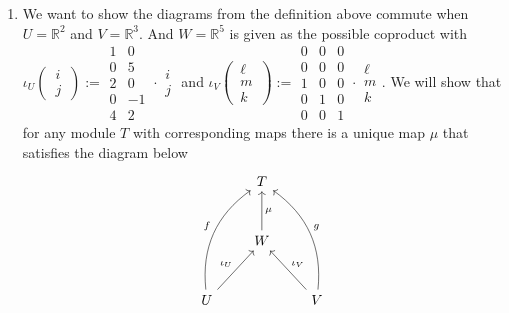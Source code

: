 \documentclass[12pt]{amsart}
\theoremstyle{definition}
\newcommand{\R}{\mathbb{R}}
\newcommand{\ip}[1]{\langle#1\rangle}
\begin{document}
\begin{enumerate}
\item %
 We want to show the diagrams from the definition above commute when $U=\R^2$ and $V=\R^3$. And $W=\R^5$ is given as the possible coproduct with $\iota_U\left(\,\boxed{\begin{matrix}i\\j \end{matrix}}\,\right):=
 \boxed{\begin{matrix}1 & 0 \\0 & 5 \\2 & 0 \\0 & -1 \\4 & 2\end{matrix}}\cdot\boxed{\begin{matrix}i\\j \end{matrix}}
$ and $\iota_V\left(\,\boxed{\begin{matrix}\ell\\m\\k \end{matrix}}\,\right):=
 \boxed{\begin{matrix}
0 & 0 & 0\\
0 & 0 & 0 \\
1 & 0 & 0 \\
0 & 1 & 0 \\
0 & 0 & 1
\end{matrix}}
\cdot \boxed{\begin{matrix}\ell\\m\\k \end{matrix}}$. We will show that for any module $T$ with corresponding maps there is a unique map $\mu$ that satisfies the diagram below
 \[
\begin{tikzcd}[row sep=1cm, column sep=.75cm]
     & T \\
     & W\arrow[u, "\mu"'] \\
     U\arrow[ur, "\iota_U"]\arrow[uur, bend left, "f"]& & V\arrow[uul, bend right, "g"']\arrow[ul, "\iota_V"']
    \end{tikzcd}
 \]


\end{enumerate}
\end{document}
